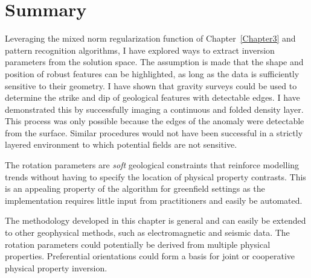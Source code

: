 \section{Summary}
Leveraging the mixed norm regularization function of Chapter~\ref{Chapter3} and pattern recognition algorithms, I have explored ways to extract inversion parameters from the solution space. The assumption is made that the shape and position of robust features can be highlighted, as long as the data is sufficiently sensitive to their geometry. I have shown that gravity surveys could be used to determine the strike and dip of geological features with detectable edges. I have demonstrated this by successfully imaging a continuous and folded density layer. This process was only possible because the edges of the anomaly were detectable from the surface. Similar procedures would not have been successful in a strictly layered environment to which potential fields are not sensitive.

The rotation parameters are \emph{soft} geological constraints that reinforce modelling trends without having to specify the location of physical property contrasts. This is an appealing property of the algorithm for greenfield settings as the implementation requires little input from practitioners and easily be automated.

The methodology developed in this chapter is general and can easily be extended to other geophysical methods, such as electromagnetic and seismic data. The rotation parameters could potentially be derived from multiple physical properties. Preferential orientations could form a basis for joint or cooperative physical property inversion.

\endinput

